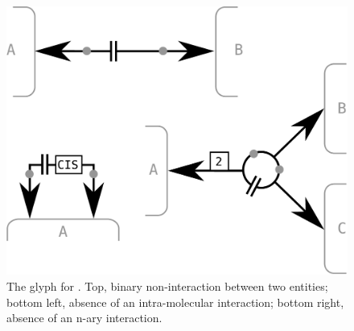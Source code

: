 \begin{figure}[H]
  \centering
  \includegraphics[scale = 0.3]{images/non-interaction}
  \caption{The \ER glyph for . Top, binary non-interaction between two entities; bottom left, absence of an intra-molecular interaction; bottom right, absence of an n-ary interaction.}
  \label{fig:interaction}
\end{figure}
% 



\normalcolor